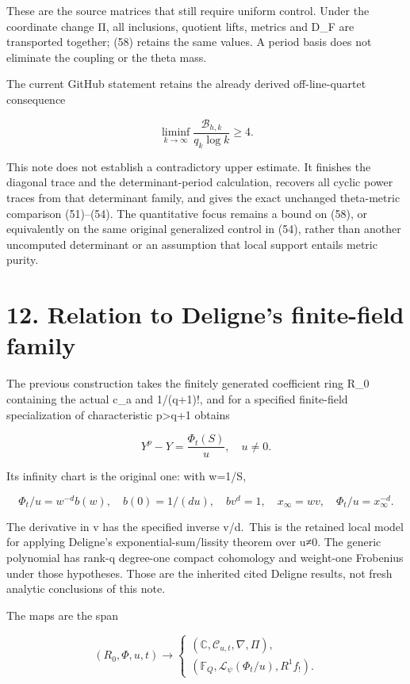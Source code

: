 \documentclass[
  11pt,
]{article}
\begin{document}
These are the source matrices that still require uniform control. Under
the coordinate change Π, all inclusions, quotient lifts, metrics and
D\_F are transported together; (58) retains the same values. A period
basis does not eliminate the coupling or the theta mass.

The current GitHub statement retains the already derived
off-line-quartet consequence

\[
\liminf_{k\to\infty}\frac{\mathcal B_{h,k}}{q_k\log k}\ge4.
\tag{59}
\]

This note does not establish a contradictory upper estimate. It finishes
the diagonal trace and the determinant-period calculation, recovers all
cyclic power traces from that determinant family, and gives the exact
unchanged theta-metric comparison (51)--(54). The quantitative focus
remains a bound on (58), or equivalently on the same original
generalized control in (54), rather than another uncomputed determinant
or an assumption that local support entails metric purity.

\section{12. Relation to Deligne's finite-field
family}\label{relation-to-delignes-finite-field-family}

The previous construction takes the finitely generated coefficient ring
R\_0 containing the actual c\_a and 1/(q+1)!, and for a specified
finite-field specialization of characteristic p\textgreater q+1 obtains

\[
Y^p-Y=\frac{\Phi_t(S)}u,\quad u\ne0.
\tag{60}
\]

Its infinity chart is the original one: with w=1/S,

\[
\Phi_t/u=w^{-d}b(w),\quad b(0)=1/(du),\quad
b v^d=1,\quad x_\infty=wv,\quad \Phi_t/u=x_\infty^{-d}.
\tag{61}
\]

The derivative in v has the specified inverse v/d.~This is the retained
local model for applying Deligne's exponential-sum/lissity theorem over
u≠0. The generic polynomial has rank-q degree-one compact cohomology and
weight-one Frobenius under those hypotheses. Those are the inherited
cited Deligne results, not fresh analytic conclusions of this note.

The maps are the span

\[
(R_0,\Phi,u,t)\longrightarrow
\begin{cases}
(\mathbb C,\mathcal C_{u,t},\nabla,\Pi),\\
(\mathbb F_Q,\mathcal L_\psi(\Phi_t/u),R^1f_!).
\end{cases}
\tag{62}
\]
\end{document}
